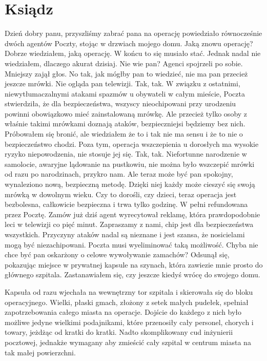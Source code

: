 \chapter{Ksiądz} 


\begin{dialogue}
\ds{} Dzień dobry panu, przyszliśmy zabrać pana na operację \dm{} powiedziało równocześnie dwóch agentów Poczty, stojąc w drzwiach mojego domu.
\ds{} Jaką znowu operację? \dm{} Dobrze wiedziałem, jaką operację. W końcu to się musiało stać. Jednak nadal nie wiedziałem, dlaczego akurat dzisiaj.
\ds{} Nie wie pan? \dm{} Agenci spojrzeli po sobie. Mniejszy zajął głos. \dm{} No tak, jak mógłby pan to wiedzieć, nie ma pan przecież jeszcze mrówki. Nie ogląda pan telewizji.
Tak, tak.
W związku z ostatnimi, niewytłumaczalnymi atakami spazmów u obywateli w całym mieście, Poczta stwierdziła, że dla bezpieczeństwa, 
wszyscy nieochipowani przy urodzeniu powinni obowiązkowo mieć zainstalowaną mrówkę.
\ds{} Ale przecież tylko osoby z właśnie takimi mrówkami doznają ataków, bezpieczniejsi będziemy bez nich. \dm{} Próbowałem się bronić, ale wiedziałem że
to i tak nie ma sensu i że to nie o bezpieczeństwo chodzi. \dm{} Poza tym, operacja wszczepienia u dorosłych ma wysokie ryzyko niepowodzenia, nie stosuje jej się.
\ds{} Tak, tak. Niefortunne narodzenie w samolocie, awaryjne lądowanie na pustkowiu, nie można było wszczepić mrówki od razu po narodzinach, przykro nam.
Ale teraz może być pan spokojny, wynaleziono nową, bezpieczną metodę. Dzięki niej każdy może cieszyć się swoją mrówką w dowolnym wieku.
Czy to dorośli, czy dzieci, teraz operacja jest bezbolesna, całkowicie bezpieczna i trwa tylko godzinę.
W pełni refundowana przez Pocztę. Zamów już dziś \dm{} agent wyrecytował reklamę, która prawdopodobnie leci w telewizji co pięć minut. \dm{}
Zapraszamy z nami, chip jest dla bezpieczeństwa wszystkich. Przyczyny ataków nadal są nieznane i jest szansa, że nosicielami mogą być niezachipowani.
Poczta musi wyeliminować taką możliwość.
Chyba nie chce być pan oskarżony o celowe wywoływanie zamachów? \dm{} Odsunął się, pokazując miejsce w prywatnej kapsule na szynach, która zawiezie mnie prosto do 
głównego szpitala. Zastanawiałem się, czy jeszcze kiedyś wrócę do swojego domu.
\end{dialogue}

\divider{}

Kapsuła od razu wjechała na wewnętrzny tor szpitala i skierowała się do bloku operacyjnego. 
Wielki, płaski gmach, złożony z setek małych pudełek, spełniał zapotrzebowania całego miasta na operacje.
Dojście do każdego z nich było możliwe jedyne wielkimi podajnikami, które przenosiły cały personel, chorych i towary, jeżdżąc od kratki do kratki.
Nadto skomplikowany cud inżynierii pocztowej, jednakże wymagany aby zmieścić cały szpital w centrum miasta na tak małej powierzchni.

